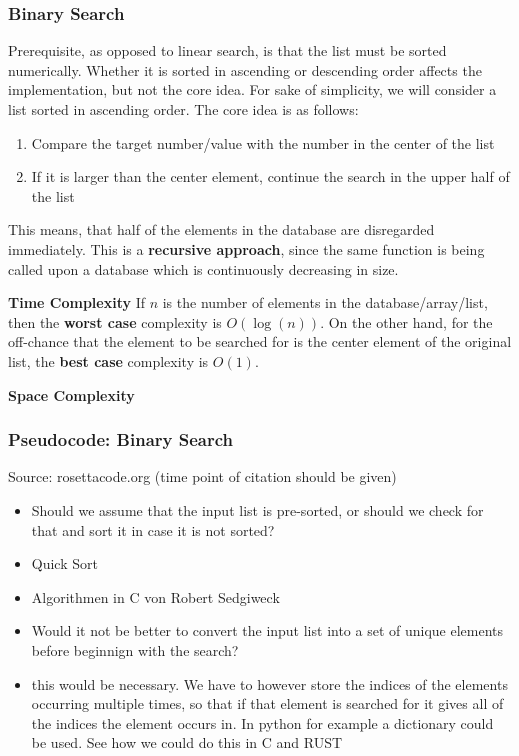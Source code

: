 \documentclass{article}
\begin{document}
\subsubsection{Binary Search}
Prerequisite, as opposed to linear search, is that the list must be sorted numerically. Whether it is sorted in ascending or descending order affects the implementation, but not the core idea. For sake of simplicity, we will consider a list sorted in ascending order. \newline
The core idea is as follows:
\begin{enumerate}
    \item Compare the target number/value with the number in the center of the list
    \item If it is larger than the center element, continue the search in the upper half of the list
\end{enumerate}
This means, that half of the elements in the database are disregarded immediately. This is a \textbf{recursive approach}, since the same function is being called upon a database which is continuously decreasing in size.\newline 


\textbf{Time Complexity} \newline
\newline
If $n$ is the number of elements in the database/array/list, then the \textbf{worst case} complexity is $O(\log(n))$. On the other hand, for the off-chance that the element to be searched for is the center element of the original list, the \textbf{best case} complexity is $O(1)$.\newline 

\textbf{Space Complexity} \newline
\newline

\subsubsection{Pseudocode: Binary Search}
\textrightarrow Source: rosettacode.org (time point of citation should be given)
\begin{itemize}
    \item \textrightarrow Should we assume that the input list is pre-sorted, or should we check for that and sort it in case it is not sorted?
    \item \textrightarrow Quick Sort
    \item Algorithmen in C von Robert Sedgiweck
    \item \textrightarrow Would it not be better to convert the input list into a set of unique elements before beginnign with the search?
    \item this would be necessary. We have to however store the indices of the elements occurring multiple times, so that if that element is searched for it gives all of the indices the element occurs in. In python for example a dictionary could be used. See how we could do this in C and RUST 
\end{itemize}
\end{document}
